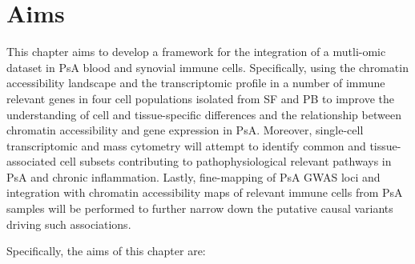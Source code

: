 


\section{Aims}

This chapter aims to develop a framework for the integration of a mutli-omic dataset in PsA blood and synovial immune cells. Specifically, using the chromatin accessibility landscape and the transcriptomic profile in a number of immune relevant genes in four cell populations isolated from SF and PB to improve the understanding of cell and tissue-specific differences and the relationship between chromatin accessibility and gene expression in PsA. Moreover, single-cell transcriptomic and mass cytometry will attempt to identify common and tissue-associated cell subsets contributing to pathophysiological relevant pathways in PsA and chronic inflammation. Lastly, fine-mapping of PsA GWAS loci and integration with chromatin accessibility maps of relevant immune cells from PsA samples will be performed to further narrow down the putative causal variants driving such associations. 


Specifically, the aims of this chapter are:


